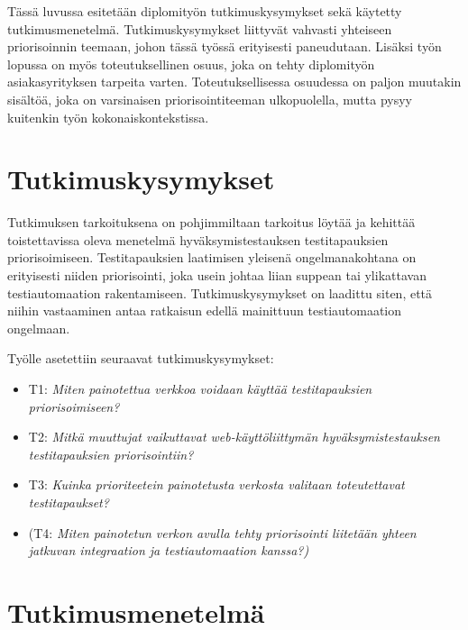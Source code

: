 Tässä luvussa esitetään diplomityön tutkimuskysymykset sekä käytetty tutkimusmenetelmä.
Tutkimuskysymykset liittyvät vahvasti yhteiseen priorisoinnin teemaan, johon tässä työssä erityisesti paneudutaan.
Lisäksi työn lopussa on myös toteutuksellinen osuus, joka on tehty diplomityön asiakasyrityksen tarpeita varten.
Toteutuksellisessa osuudessa on paljon muutakin sisältöä, joka on varsinaisen priorisointiteeman ulkopuolella, mutta pysyy kuitenkin työn kokonaiskontekstissa.

\section{Tutkimuskysymykset}

Tutkimuksen tarkoituksena on pohjimmiltaan tarkoitus löytää ja kehittää toistettavissa oleva menetelmä hyväksymistestauksen testitapauksien priorisoimiseen.
Testitapauksien laatimisen yleisenä ongelmanakohtana on erityisesti niiden priorisointi, joka usein johtaa liian suppean tai ylikattavan testiautomaation rakentamiseen.
Tutkimuskysymykset on laadittu siten, että niihin vastaaminen antaa ratkaisun edellä mainittuun testiautomaation ongelmaan.

Työlle asetettiin seuraavat tutkimuskysymykset:
\begin{itemize}
  \item T1: \emph{Miten painotettua verkkoa voidaan käyttää testitapauksien priorisoimiseen?}
  \item T2: \emph{Mitkä muuttujat vaikuttavat web-käyttöliittymän hyväksymistestauksen testitapauksien priorisointiin?}
  \item T3: \emph{Kuinka prioriteetein painotetusta verkosta valitaan toteutettavat testitapaukset?}
  \item (T4: \emph{Miten painotetun verkon avulla tehty priorisointi liitetään yhteen jatkuvan integraation ja testiautomaation kanssa?)}
\end{itemize}

\section{Tutkimusmenetelmä}

